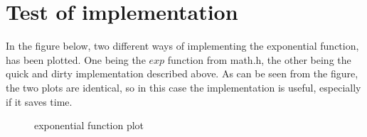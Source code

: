 \documentclass[]{article}
\begin{document}
\section*{Test of implementation}
In the figure below, two different ways of implementing the exponential function, has been plotted. One being the $exp$ function from math.h, the other being the quick and dirty implementation described above. As can be seen from the figure, the two plots are identical, so in this case the implementation is useful, especially if it saves time.

\begin{figure}[h]
	
	\caption{exponential function plot}
	\label{fig:gpl}
\end{figure}
\end{document}
